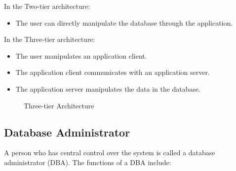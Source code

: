 \documentclass{article}
\begin{document}
In the Two-tier architecture:
\begin{itemize}
    \item The user can directly manipulate the database through the application.
\end{itemize}

In the Three-tier architecture:
\begin{itemize}
    \item The user manipulates an application client.
    \item The application client communicates with an application server.
    \item The application server manipulates the data in the database.
\end{itemize}

\begin{figure}[htbp]
    \centering
    \caption{Three-tier Architecture}
\end{figure}



\subsection*{Database Administrator}

A person who has central control over the system is called a database administrator (DBA). The functions of a DBA include:
\end{document}
